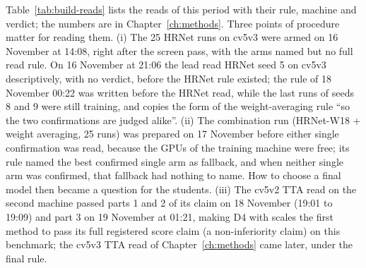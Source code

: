 Table~\ref{tab:build-reads} lists the reads of this period with their rule, machine and verdict; the numbers are in
Chapter~\ref{ch:methods}. Three points of procedure matter for reading them. (i) The 25 HRNet runs on cv5v3 were armed on 16 November at
14:08, right after the screen pass, with the arms named but no full read rule. On 16 November at 21:06 the lead read HRNet seed 5
on cv5v3 descriptively, with no verdict, before the HRNet rule existed; the rule of 18 November 00:22 was written before the HRNet
read, while the last runs of seeds 8 and 9 were still training, and copies the form of the weight-averaging rule ``so the two
confirmations are judged alike''. (ii) The combination run
(HRNet-W18 + weight averaging, 25 runs) was prepared on 17 November before either single confirmation was read, because the GPUs of
the training machine were free; its rule named the best confirmed single arm as fallback, and when neither single arm was
confirmed, that fallback had nothing to name. How to choose a final model then became a question for the students. (iii) The
cv5v2 TTA read on the second machine passed parts 1 and 2 of its claim on 18 November (19:01 to 19:09) and part 3 on 19 November at
01:21, making D4 with scales the first method to pass its full registered score claim (a non-inferiority claim) on this benchmark; the cv5v3 TTA read of
Chapter~\ref{ch:methods} came later, under the final rule.

